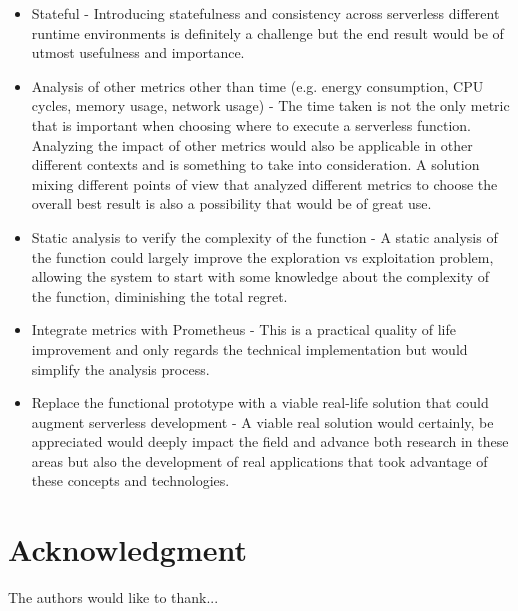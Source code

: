 \documentclass[conference]{IEEEtran}
\begin{document}
\begin{itemize}
    \item Stateful - Introducing statefulness and consistency across serverless
        different runtime environments is definitely a challenge but the end result would be of utmost usefulness and importance.
    \item Analysis of other metrics other than time (e.g. energy consumption, CPU
        cycles, memory usage, network usage) - The time taken is not the only metric that is important when choosing where to execute a serverless function. Analyzing the impact of other metrics would also be applicable in other different contexts and is something to take into consideration.
        A solution mixing different points of view that analyzed different metrics to choose the overall best result is also a possibility that would be of great use.
    \item Static analysis to verify the complexity of the function - A static analysis
        of the function could largely improve the exploration vs exploitation problem, allowing the system to start with some knowledge about the complexity of the function, diminishing the total regret.
    \item Integrate metrics with Prometheus - This is a practical quality of life
        improvement and only regards the technical implementation but would simplify the analysis process.
    \item Replace the functional prototype with a viable real-life solution that
        could augment serverless development - A viable real solution would
        certainly, be appreciated would deeply impact the field and advance
        both research in these areas but also the development of real applications
        that took advantage of these concepts and technologies.
\end{itemize}









\section*{Acknowledgment}


The authors would like to thank...
\end{document}
